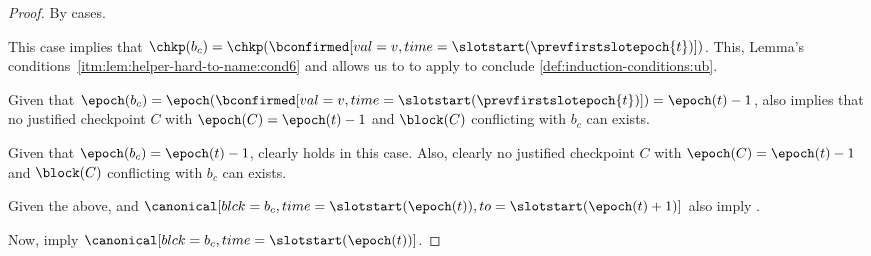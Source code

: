 \documentclass{article}
\begin{document}
\begin{proof}
    By cases.
    \begin{description}[style=nextline]
        \item[Case 1: condition \ref{itm:lem:helper-hard-to-name:a} holds.] 
        This case implies that $\chkp(b_c) = \chkp(\bconfirmed[val=v,time=\slotstart(\prevfirstslotepoch{t})])$.
        This, Lemma's conditions~\ref{itm:lem:helper-hard-to-name:cond6} and  allows us to to apply  to conclude \ref{def:induction-conditions:ub}.

        Given that $\epoch(b_c) = \epoch(\bconfirmed[val=v,time=\slotstart(\prevfirstslotepoch{t})]) = \epoch(t)-1$,
         also implies that no justified checkpoint $C$ with $\epoch(C)=\epoch(t)-1$ and $\block(C)$ conflicting with $b_c$ can exists.



        
        \item[Case 2: condition \ref{itm:lem:helper-hard-to-name:b} holds.] 
        Given that $\epoch(b_c) = \epoch(t)-1$, \sirfour clearly holds in this case.
        Also, clearly no justified checkpoint $C$ with $\epoch(C)=\epoch(t)-1$ and $\block(C)$ conflicting with $b_c$ can exists.
    \end{description}

    Given the above,  and $\canonical[blck={b_c},time=\slotstart(\epoch(t)),to=\slotstart(\epoch(t)+1)]$ also imply \sirfive.

    Now,  imply  $\canonical[blck={b_c},time=\slotstart(\epoch(t))]$.




\end{proof}
\end{document}

